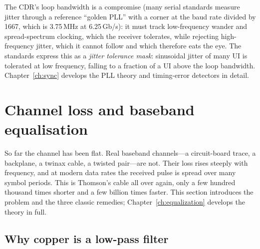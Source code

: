 
The CDR's loop bandwidth is a compromise (many serial standards measure jitter through a
reference ``golden PLL'' with a corner at the baud rate divided by 1667, which is 3.75\,MHz at
6.25\,Gb/s): it must track low-frequency wander and spread-spectrum clocking, which the
receiver tolerates, while rejecting high-frequency jitter, which it cannot follow and which
therefore eats the eye. The standards express this as a \emph{jitter tolerance mask}:
sinusoidal jitter of many UI is tolerated at low frequency, falling to a fraction of a UI
above the loop bandwidth. Chapter~\ref{ch:sync} develops the PLL theory and timing-error
detectors in detail.

\section{Channel loss and baseband equalisation}
\label{sec:ch08:channel}

So far the channel has been flat. Real baseband channels---a circuit-board trace, a backplane,
a twinax cable, a twisted pair---are not. Their loss rises steeply with frequency, and at modern
data rates the received pulse is spread over many symbol periods. This is Thomson's cable all
over again, only a few hundred thousand times shorter and a few billion times faster. This
section introduces the problem and the three classic remedies; Chapter~\ref{ch:equalization}
develops the theory in full.


\subsection{Why copper is a low-pass filter}

